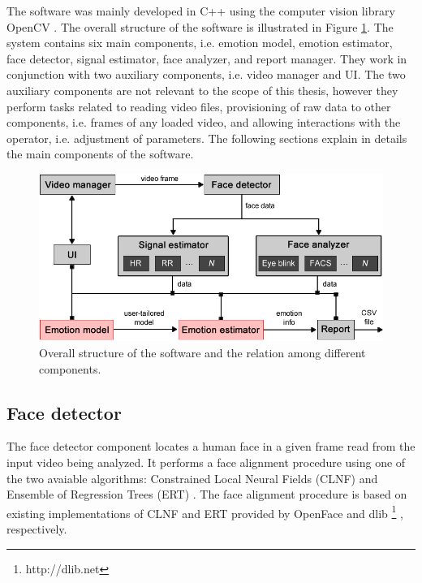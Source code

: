 The software was mainly developed in C++ using the computer vision library OpenCV \parencite{opencv_library}. The overall structure of the software is illustrated in Figure \ref{fig:tool-overall-structure}. The system contains six main components, i.e. emotion model, emotion estimator, face detector, signal estimator, face analyzer, and report manager. They work in conjunction with two auxiliary components, i.e. video manager and UI. The two auxiliary components are not relevant to the scope of this thesis, however they perform tasks related to reading video files, provisioning of raw data to other components, i.e. frames of any loaded video, and allowing interactions with the operator, i.e. adjustment of parameters. The following sections explain in details the main components of the software.

\begin{figure}
    \centering
    \includegraphics[width=\textwidth]{figures/tool-overall-structure.png}
    \caption{Overall structure of the software and the relation among different components.}
    \label{fig:tool-overall-structure}
\end{figure}

\subsection{Face detector}

The face detector component locates a human face in a given frame read from the input video being analyzed. It performs a face alignment procedure using one of the two avaiable algorithms: Constrained Local Neural Fields (CLNF) \parencite{baltrusaitis2013constrained} and Ensemble of Regression Trees (ERT) \parencite{kazemi2014one}. The face alignment procedure is based on existing implementations of CLNF and ERT provided by OpenFace \parencite{baltruvsaitis2016openface} and dlib \footnote{http://dlib.​net} \parencite{dlib09}, respectively.

